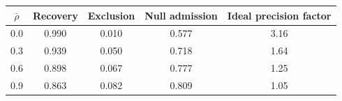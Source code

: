 \begin{tabular}{ccccc}
\toprule
$\bar{\rho}$ & Recovery & Exclusion & Null admission & Ideal precision factor \\
\midrule
0.0 & 0.990 & 0.010 & 0.577 & 3.16 \\
0.3 & 0.939 & 0.050 & 0.718 & 1.64 \\
0.6 & 0.898 & 0.067 & 0.777 & 1.25 \\
0.9 & 0.863 & 0.082 & 0.809 & 1.05 \\
\bottomrule
\end{tabular}